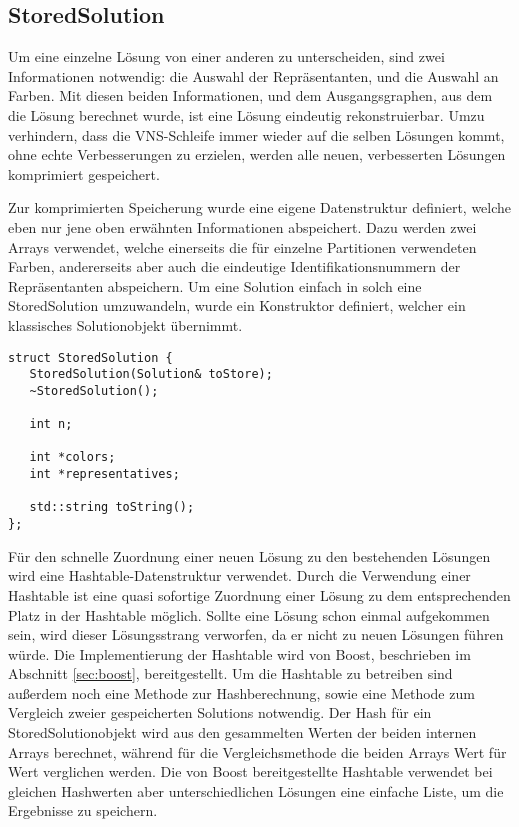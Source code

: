 \subsection{StoredSolution}
Um eine einzelne Lösung von einer anderen zu unterscheiden, sind zwei Informationen notwendig: die Auswahl der Repräsentanten, und die Auswahl 
an Farben. Mit diesen beiden Informationen, und dem Ausgangsgraphen, aus dem die Lösung berechnet wurde, ist eine Lösung eindeutig rekonstruierbar.
Umzu verhindern, dass die VNS-Schleife immer wieder auf die selben Lösungen kommt, ohne echte Verbesserungen zu erzielen, werden alle neuen, verbesserten
Lösungen komprimiert gespeichert. 

Zur komprimierten Speicherung wurde eine eigene Datenstruktur definiert, welche eben nur jene oben erwähnten Informationen abspeichert. 
Dazu werden zwei Arrays verwendet, welche einerseits die für einzelne Partitionen verwendeten Farben, andererseits aber auch die 
eindeutige Identifikationsnummern der Repräsentanten abspeichern. Um eine Solution einfach in solch eine StoredSolution umzuwandeln, wurde
ein Konstruktor definiert, welcher ein klassisches Solutionobjekt übernimmt. 

\singlespacing
\begin{lstlisting}[caption={Die Signatur von StoredSolution},label={lst:stored}]
struct StoredSolution {
   StoredSolution(Solution& toStore);
   ~StoredSolution();
   
   int n;
   
   int *colors;
   int *representatives;
   
   std::string toString();
};
\end{lstlisting}

Für den schnelle Zuordnung einer neuen Lösung zu den bestehenden Lösungen wird eine Hashtable-Datenstruktur verwendet. Durch die Verwendung einer
Hashtable ist eine quasi sofortige Zuordnung einer Lösung zu dem entsprechenden Platz in der Hashtable möglich. Sollte eine Lösung schon einmal 
aufgekommen sein, wird dieser Lösungsstrang verworfen, da er nicht zu neuen Lösungen führen würde. Die Implementierung der Hashtable wird von 
Boost, beschrieben im Abschnitt \ref{sec:boost}, bereitgestellt. Um die Hashtable zu betreiben sind außerdem noch eine Methode zur Hashberechnung,
sowie eine Methode zum Vergleich zweier gespeicherten Solutions notwendig. Der Hash für ein StoredSolutionobjekt wird aus den gesammelten Werten
der beiden internen Arrays berechnet, während für die Vergleichsmethode die beiden Arrays Wert für Wert verglichen werden. Die von Boost 
bereitgestellte Hashtable verwendet bei gleichen Hashwerten aber unterschiedlichen Lösungen eine einfache Liste, um die Ergebnisse zu speichern.

